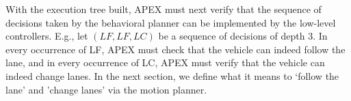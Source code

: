 With the execution tree built, APEX must next verify that the sequence of decisions taken by the behavioral planner can be implemented by the low-level controllers.
E.g., let $(LF,LF,LC)$ be a sequence of decisions of depth 3.
In every occurrence of LF, APEX must check that the vehicle can indeed follow the lane, and in every occurrence of LC, APEX must verify that the vehicle can indeed change lanes.
In the next section, we define what it means to `follow the lane' and 'change lanes' via the motion planner.


